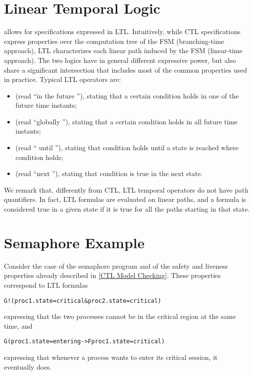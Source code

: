 \section{Linear Temporal Logic}
\label{Linear Temporal Logic}

\nusmv allows for specifications expressed in LTL. Intuitively,
while CTL specifications express properties over the computation tree of
the FSM (branching-time approach), LTL characterizes each linear path
induced by the FSM (linear-time approach). The two logics have in
general different expressive power, but also share a significant
intersection that includes most of the common properties used in
practice.
Typical LTL operators are:
\begin{itemize}
\item {} (read ``in the future ''), 
stating that a certain condition  holds in one of the future
time instants;
\item {} (read ``globally ''), 
stating that a certain condition  holds in all future time 
instants;
\item {} (read `` until ''),
stating that condition  holds until a state is reached where
condition  holds;
\item {} (read ``next ''),
stating that condition  is true in the next state.
\end{itemize}
We remark that, differently from CTL, LTL temporal operators do not have
path quantifiers. In fact, LTL formulas are evaluated on linear paths,
and a formula is considered true in a given state if it is true for all
the paths starting in that state.


\section{Semaphore Example}
\label{LTL Semaphore Example}

Consider the case of the semaphore program and of the safety and
liveness properties already described in \cref{CTL Model Checking}. 
These properties correspond to LTL formulas
\begin{alltt}
G ! (proc1.state = critical & proc2.state = critical)
\end{alltt}
expressing that the two processes cannot be in the critical region
at the same time, and 
\begin{alltt}
G (proc1.state = entering -> F proc1.state = critical)
\end{alltt}
expressing that whenever a process wants to enter its critical session,
it eventually does.

